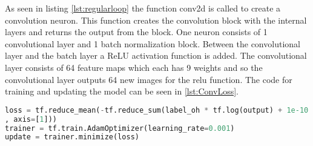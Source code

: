 As seen in listing \ref{lst:regularloop} the function conv2d is called to create a convolution neuron. This function creates the convolution block with the internal layers and returns the output from the block. One neuron consists of 1 convolutional layer and 1 batch normalization block. Between the convolutional layer and the batch layer a ReLU activation function is added. The convolutional layer consists of 64 feature maps which each has 9 weights and so the convolutional layer outputs 64 new images for the relu function. The code for training and updating the model can be seen in \ref{lst:ConvLoss}.

\begin{lstlisting}[language=Python, label=lst:ConvLoss, caption= Implementation of learning rate type ADAM]
loss = tf.reduce_mean(-tf.reduce_sum(label_oh * tf.log(output) + 1e-10
, axis=[1]))
trainer = tf.train.AdamOptimizer(learning_rate=0.001)
update = trainer.minimize(loss)
\end{lstlisting}